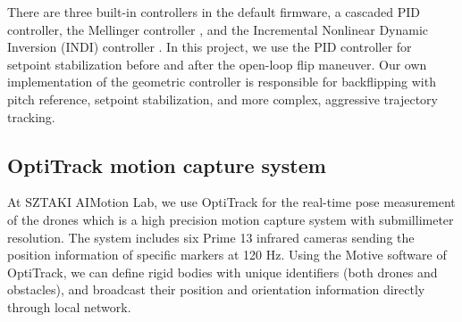 There are three built-in controllers in the default firmware, a cascaded PID controller, the Mellinger controller \cite{mellinger2011}, and the  Incremental Nonlinear Dynamic Inversion (INDI) controller \cite{indi2015}. In this project, we use the PID controller for setpoint stabilization before and after the open-loop flip maneuver. Our own implementation of the geometric controller is responsible for backflipping with pitch reference, setpoint stabilization, and more complex, aggressive trajectory tracking.








\subsection{OptiTrack motion capture system}
At SZTAKI AIMotion Lab, we use OptiTrack for the real-time pose measurement of the drones which is a high precision motion capture system with submillimeter resolution. The system includes six Prime 13 infrared cameras sending the position information of specific markers at 120 Hz. Using the Motive software of OptiTrack, we can define rigid bodies with unique identifiers (both drones and obstacles), and broadcast their position and orientation information directly through local network.

